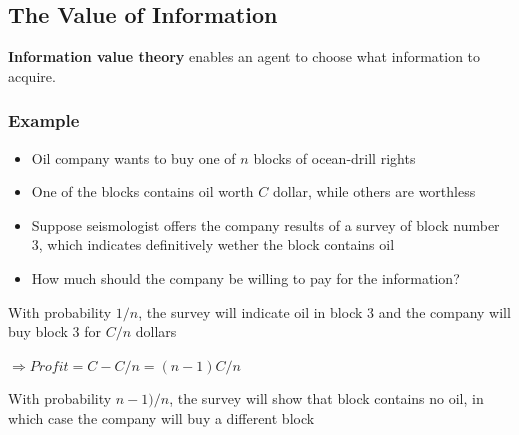 \documentclass{scrartcl}
\begin{document}

\subsection{The Value of Information}
\textbf{Information value theory} enables an agent to choose what information to acquire.

\subsubsection{Example}
\begin{itemize}
    \item
        Oil company wants to buy one of \(n\) blocks of ocean-drill rights
    \item
        One of the blocks contains oil worth \(C\) dollar, while others are worthless
    \item
        Suppose seismologist offers the company results of a survey of block number 3, which indicates definitively wether the block contains oil
    \item
        How much should the company be willing to pay for the information?
\end{itemize}

With probability \(1/n\), the survey will indicate oil in block 3 and the company will buy block 3 for \(C/n\) dollars

 \(\Rightarrow Profit = C - C/n = (n-1)C/n\)

 With probability \(n-1)/n\), the survey will show that block contains no oil, in which case the company will buy a different block
 
\end{document}
